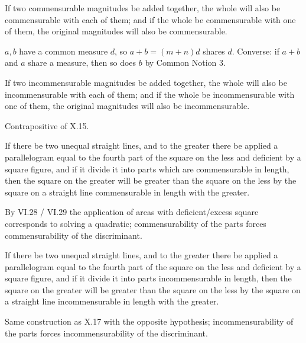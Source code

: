\documentclass{rrxiv}
\begin{document}
\begin{claim}
\label{prop:X.15}
If two commensurable magnitudes be added together, the whole will
also be commensurable with each of them; and if the whole be
commensurable with one of them, the original magnitudes will also be
commensurable.
\end{claim}
\begin{evidence}[Proof of X.15]
\label{ev:X.15}
$a, b$ have a common measure $d$, so $a + b = (m + n) d$ shares $d$.
Converse: if $a + b$ and $a$ share a measure, then so does $b$ by
Common Notion 3.
\end{evidence}

\begin{claim}
\label{prop:X.16}
If two incommensurable magnitudes be added together, the whole will
also be incommensurable with each of them; and if the whole be
incommensurable with one of them, the original magnitudes will also
be incommensurable.
\end{claim}
\begin{evidence}[Proof of X.16]
\label{ev:X.16}
Contrapositive of X.15.
\end{evidence}

\begin{claim}
\label{prop:X.17}
If there be two unequal straight lines, and to the greater there be
applied a parallelogram equal to the fourth part of the square on the
less and deficient by a square figure, and if it divide it into parts
which are commensurable in length, then the square on the greater
will be greater than the square on the less by the square on a
straight line commensurable in length with the greater.
\end{claim}
\begin{evidence}[Proof of X.17]
\label{ev:X.17}
By VI.28 / VI.29 the application of areas with deficient/excess
square corresponds to solving a quadratic; commensurability of the
parts forces commensurability of the discriminant.
\end{evidence}

\begin{claim}
\label{prop:X.18}
If there be two unequal straight lines, and to the greater there be
applied a parallelogram equal to the fourth part of the square on the
less and deficient by a square figure, and if it divide it into parts
incommensurable in length, then the square on the greater will be
greater than the square on the less by the square on a straight line
incommensurable in length with the greater.
\end{claim}
\begin{evidence}[Proof of X.18]
\label{ev:X.18}
Same construction as X.17 with the opposite hypothesis;
incommensurability of the parts forces incommensurability of the
discriminant.
\end{evidence}
\end{document}
